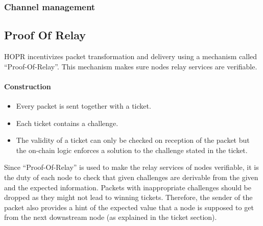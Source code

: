 \subsubsection{Channel management}
\subsection{Proof Of Relay}

HOPR incentivizes packet transformation and delivery using a mechanism called “Proof-Of-Relay”. 
This mechanism makes sure nodes relay services are verifiable.
\paragraph{Construction} 
\begin{itemize}
    \item Every packet is sent together with a ticket. 
    \item Each ticket contains a challenge.
    \item The validity of a ticket can only be checked on reception of the packet but the on-chain logic enforces a solution to the challenge stated in the ticket.
\end{itemize}
Since “Proof-Of-Relay” is used to make the relay services of nodes verifiable, it is the duty of each node to check that given challenges are derivable from the given and the expected information. 
Packets with inappropriate challenges should be dropped as they might not lead to winning tickets.
Therefore, the sender of the packet also provides a hint of the expected value that a node is supposed to get from the next downstream node (as explained in the ticket section). 











